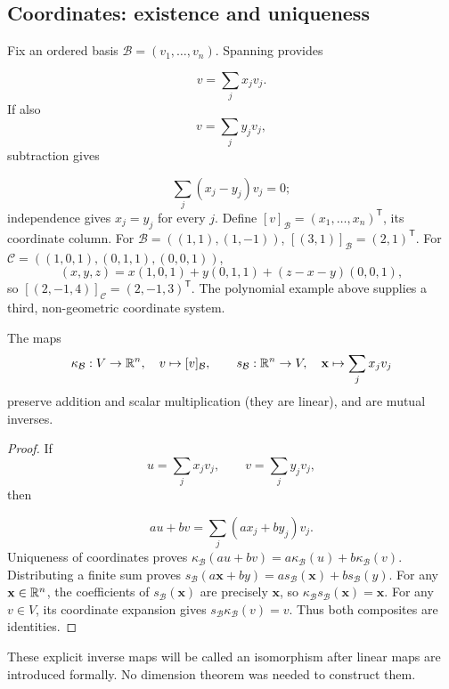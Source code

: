 \subsection{Coordinates: existence and uniqueness}
Fix an ordered basis $\mathcal B=(v_1,\ldots,v_n)$. Spanning provides

\[
v=\sum_jx_jv_j.
\]
 If also
\[
v=\sum_jy_jv_j,
\]
 subtraction gives

\[
\sum_j(x_j-y_j)v_j=0;
\]
 independence gives $x_j=y_j$ for every $j$.
Define $[v]_{\mathcal B}=(x_1,\ldots,x_n)^{\mathsf T}$, its coordinate column.
For $\mathcal B=((1,1),(1,-1))$, $[(3,1)]_{\mathcal B}=(2,1)^{\mathsf T}$.
For $\mathcal C=((1,0,1),(0,1,1),(0,0,1))$,
\[
(x,y,z)=x(1,0,1)+y(0,1,1)+(z-x-y)(0,0,1),
\]
so $[(2,-1,4)]_{\mathcal C}=(2,-1,3)^{\mathsf T}$.
The polynomial example above supplies a third, non-geometric coordinate system.

\begin{proposition}\label{prop:coordinate-isomorphism}
The maps
\[
\kappa_{\mathcal B}:V\to\mathbb{R}^n,\quad v\mapsto[v]_{\mathcal B},
\qquad s_{\mathcal B}:\mathbb{R}^n\to V,\quad \mathbf{x}\mapsto\sum_jx_jv_j
\]
preserve addition and scalar multiplication (they are linear), and are
mutual inverses.
\end{proposition}
\begin{proof}
If
\[
u=\sum_jx_jv_j,\qquad v=\sum_jy_jv_j,
\]
 then

\[
au+bv=\sum_j(ax_j+by_j)v_j.
\]
 Uniqueness of coordinates proves
$\kappa_{\mathcal B}(au+bv)=a\kappa_{\mathcal B}(u)+b\kappa_{\mathcal B}(v)$.
Distributing a finite sum proves
$s_{\mathcal B}(a\mathbf{x}+by)=as_{\mathcal B}(\mathbf{x})+bs_{\mathcal B}(y)$.
For any $\mathbf{x}\in\mathbb{R}^n$, the coefficients of $s_{\mathcal B}(\mathbf{x})$ are precisely
$\mathbf{x}$, so $\kappa_{\mathcal B}s_{\mathcal B}(\mathbf{x})=\mathbf{x}$.
For any $v\in V$, its coordinate expansion gives
$s_{\mathcal B}\kappa_{\mathcal B}(v)=v$. Thus both composites are identities.
\end{proof}
These explicit inverse maps will be called an isomorphism after linear maps
are introduced formally. No dimension theorem was needed to construct them.

